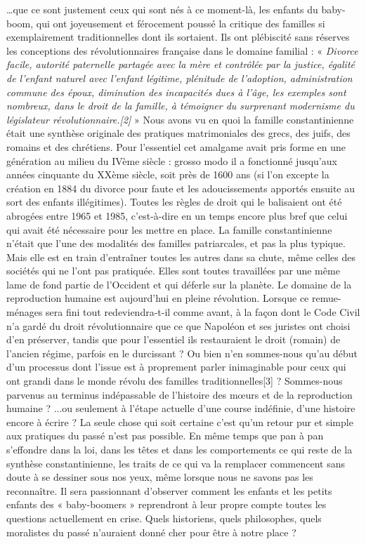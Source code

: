  …que ce sont justement ceux qui sont nés à ce moment-là, les enfants du baby-boom, qui ont joyeusement et férocement poussé la critique des familles si exemplairement traditionnelles dont ils sortaient. Ils ont plébiscité sans réserves les conceptions des révolutionnaires française dans le domaine familial : « \emph{Divorce facile, autorité paternelle partagée avec la mère et contrôlée par la justice, égalité de l'enfant naturel avec l'enfant légitime, plénitude de l'adoption, administration commune des époux, diminution des incapacités dues à l'âge, les exemples sont nombreux, dans le droit de la famille, à témoigner du surprenant modernisme du législateur révolutionnaire.[2]} »
 Nous avons vu en quoi la famille constantinienne était une synthèse originale des pratiques matrimoniales des grecs, des juifs, des romains et des chrétiens. Pour l'essentiel cet amalgame avait pris forme en une génération au milieu du IVème siècle : grosso modo il a fonctionné jusqu'aux années cinquante du XXème siècle, soit près de 1600 ans (si l'on excepte la création en 1884 du divorce pour faute et les adoucissements apportés ensuite au sort des enfants illégitimes). Toutes les règles de droit qui le balisaient ont été abrogées entre 1965 et 1985, c'est-à-dire en un temps encore plus bref que celui qui avait été nécessaire pour les mettre en place. 
 La famille constantinienne n'était que l'une des modalités des familles patriarcales, et pas la plus typique. Mais elle est en train d'entraîner toutes les autres dans sa chute, même celles des sociétés qui ne l'ont pas pratiquée. Elles sont toutes travaillées par une même lame de fond partie de l'Occident et qui déferle sur la planète. Le domaine de la reproduction humaine est aujourd'hui en pleine révolution. 
 Lorsque ce remue-ménages sera fini tout redeviendra-t-il comme avant, à la façon dont le Code Civil n'a gardé du droit révolutionnaire que ce que Napoléon et ses juristes ont choisi d'en préserver, tandis que pour l'essentiel ils restauraient le droit (romain) de l'ancien régime, parfois en le durcissant ? 
 Ou bien n'en sommes-nous qu'au début d'un processus dont l'issue est à proprement parler inimaginable pour ceux qui ont grandi dans le monde révolu des familles traditionnelles[3] ? 
 Sommes-nous parvenus au terminus indépassable de l'histoire des mœurs et de la reproduction humaine ?
 ...ou seulement à l'étape actuelle d'une course indéfinie, d'une histoire encore à écrire ? 
 La seule chose qui soit certaine c'est qu'un retour pur et simple aux pratiques du passé n'est pas possible. 
 En même temps que pan à pan s'effondre dans la loi, dans les têtes et dans les comportements ce qui reste de la synthèse constantinienne, les traits de ce qui va la remplacer commencent sans doute à se dessiner sous nos yeux, même lorsque nous ne savons pas les reconnaître. Il sera passionnant d'observer comment les enfants et les petits enfants des « baby-boomers » reprendront à leur propre compte toutes les questions actuellement en crise. 
 Quels historiens, quels philosophes, quels moralistes du passé n'auraient donné cher pour être à notre place ?
 
